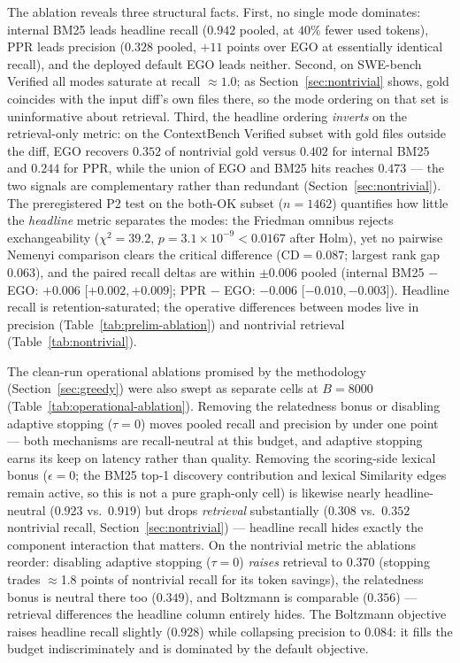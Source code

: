 \documentclass[11pt, a4paper]{article}
\begin{document}
The ablation reveals three structural facts. First, no single mode dominates: internal BM25 leads headline recall ($0.942$ pooled, at $40\%$ fewer used tokens), PPR leads precision ($0.328$ pooled, $+11$ points over EGO at essentially identical recall), and the deployed default EGO leads neither. Second, on SWE-bench Verified all modes saturate at recall $\approx 1.0$; as Section~\ref{sec:nontrivial} shows, gold coincides with the input diff's own files there, so the mode ordering on that set is uninformative about retrieval. Third, the headline ordering \emph{inverts} on the retrieval-only metric: on the ContextBench Verified subset with gold files outside the diff, EGO recovers $0.352$ of nontrivial gold versus $0.402$ for internal BM25 and $0.244$ for PPR, while the union of EGO and BM25 hits reaches $0.473$ --- the two signals are complementary rather than redundant (Section~\ref{sec:nontrivial}). The preregistered P2 test on the both-OK subset ($n{=}1462$) quantifies how little the \emph{headline} metric separates the modes: the Friedman omnibus rejects exchangeability ($\chi^2 = 39.2$, $p = 3.1\times10^{-9} < 0.0167$ after Holm), yet no pairwise Nemenyi comparison clears the critical difference ($\mathrm{CD} = 0.087$; largest rank gap $0.063$), and the paired recall deltas are within $\pm 0.006$ pooled (internal BM25 $-$ EGO: $+0.006$ [$+0.002, +0.009$]; PPR $-$ EGO: $-0.006$ [$-0.010, -0.003$]). Headline recall is retention-saturated; the operative differences between modes live in precision (Table~\ref{tab:prelim-ablation}) and nontrivial retrieval (Table~\ref{tab:nontrivial}).

The clean-run operational ablations promised by the methodology (Section~\ref{sec:greedy}) were also swept as separate cells at $B{=}8000$ (Table~\ref{tab:operational-ablation}). Removing the relatedness bonus or disabling adaptive stopping ($\tau{=}0$) moves pooled recall and precision by under one point --- both mechanisms are recall-neutral at this budget, and adaptive stopping earns its keep on latency rather than quality. Removing the scoring-side lexical bonus ($\epsilon{=}0$; the BM25 top-1 discovery contribution and lexical Similarity edges remain active, so this is not a pure graph-only cell) is likewise nearly headline-neutral ($0.923$ vs.\ $0.919$) but drops \emph{retrieval} substantially ($0.308$ vs.\ $0.352$ nontrivial recall, Section~\ref{sec:nontrivial}) --- headline recall hides exactly the component interaction that matters. On the nontrivial metric the ablations reorder: disabling adaptive stopping ($\tau{=}0$) \emph{raises} retrieval to $0.370$ (stopping trades $\approx$1.8 points of nontrivial recall for its token savings), the relatedness bonus is neutral there too ($0.349$), and Boltzmann is comparable ($0.356$) --- retrieval differences the headline column entirely hides. The Boltzmann objective raises headline recall slightly ($0.928$) while collapsing precision to $0.084$: it fills the budget indiscriminately and is dominated by the default objective.
\end{document}
